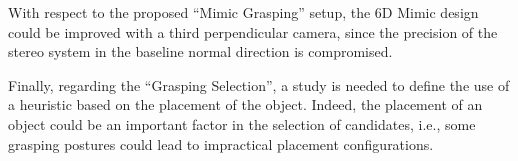 With respect to the proposed ``Mimic Grasping'' setup, the 6D Mimic design could be improved with a third perpendicular camera, since the precision of the stereo system in the baseline normal direction is compromised.

Finally, regarding the ``Grasping Selection'', a study is needed to define the use of a heuristic based on the placement of the object. Indeed, the placement of an object could be an important factor in the selection of candidates, i.e., some grasping postures could lead to impractical placement configurations.



  








